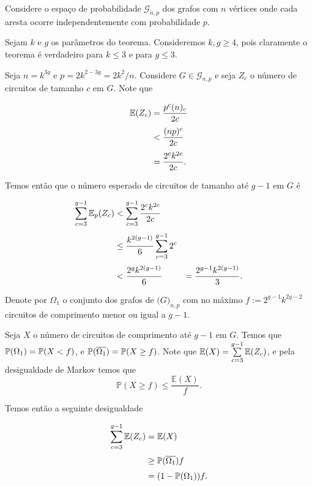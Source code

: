 Considere o espaço de probabilidade $\mathcal{G}_{n,p}$ dos grafos com $n$ vértices onde cada aresta ocorre independentemente com probabilidade $p$.

Sejam $k$ e $g$ os parâmetros do teorema. Consideremos $k,g \geq 4$, pois claramente o teorema é verdadeiro para $k \leq 3$ e para $g \leq 3$. 

Seja $n = k^{3g}$ e $p = 2k^{2-3g} = 2k^2/n$. Considere $G \in\mathcal{G}_{n,p}$ e seja $Z_c$ o número de circuitos de tamanho $c$ em $G$. Note que

\begin{equation*}
\setlength{\jot}{6pt}
\begin{aligned}
\bbe(Z_c) &= \frac{p^c(n)_c}{2c} \\
&< \frac{(np)^c}{2c} \\
&= \frac{2^ck^{2c}}{2c}.
\end{aligned}
\end{equation*}

Temos então que o número esperado de circuitos de tamanho até $g-1$ em $G$ é

\begin{equation*}
\setlength{\jot}{6pt}
\begin{aligned}
\sum\limits_{c=3}^{g-1}\bbe_p(Z_c) &< \sum\limits_{c=3}^{g-1}\frac{2^ck^{2c}}{2c} \\
&\leq \frac{k^{2(g-1)}}{6}\sum\limits_{c=3}^{g-1}2^c \\
&< \frac{2^gk^{2(g-1)}}{6} &= \frac{2^{g-1}k^{2(g-1)}}{3}.
\end{aligned}
\end{equation*}

Denote por $\Omega_1$ o conjunto dos grafos de $\mathbb(G)_{n,p}$ com no máximo $f := 2^{g-1}k^{2g-2}$ circuitos de comprimento menor ou igual a $g-1$.

Seja $X$ o número de circuitos de comprimento até $g-1$ em $G$. Temos que $\mathbb{P}(\Omega_1) = \mathbb{P}(X < f)$, e $\mathbb{P}(\overline{\Omega_1}) = \mathbb{P}(X\geq f)$. Note que $\mathbb{E}(X) = \sum\limits_{c=3}^{g-1}\mathbb{E}(Z_c)$, e pela desigualdade de Markov temos que \[\mathbb{P}(X \geq f) \leq \frac{\mathbb{E}(X)}{f}.\]

Temos então a seguinte desigualdade

\begin{equation*}
\setlength{\jot}{6pt}
\begin{aligned}
\sum\limits_{c=3}^{g-1}\bbe(Z_c) &= \bbe(X) \\ 
&\geq \bbp(\overline{\Omega_1})f \\
&= (1 - \bbp(\Omega_1))f.
\end{aligned}
\end{equation*}

